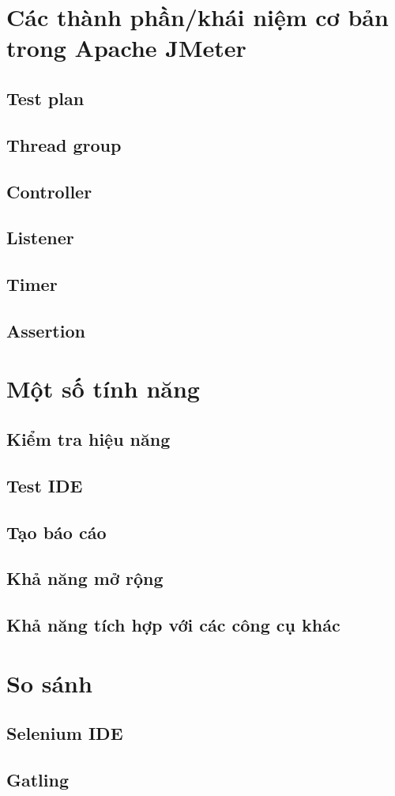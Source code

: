 \documentclass[10pt]{report}
\begin{document}
\chapter{Các thành phần/khái niệm cơ bản trong Apache JMeter}

\section{Test plan}

\section{Thread group}

\section{Controller}

\section{Listener}

\section{Timer}

\section{Assertion}


\chapter{Một số tính năng}

\section{Kiểm tra hiệu năng}

\section{Test IDE}

\section{Tạo báo cáo}

\section{Khả năng mở rộng}

\section{Khả năng tích hợp với các công cụ khác}

\chapter{So sánh}

\section{Selenium IDE}

\section{Gatling}
\end{document}
